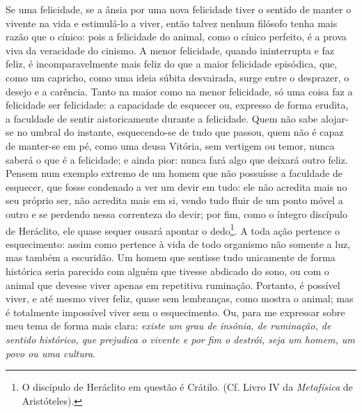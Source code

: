 Se uma felicidade, se a ânsia por uma nova felicidade tiver o sentido de
manter o vivente na vida e estimulá-lo a viver, então talvez nenhum
filósofo tenha mais razão que o cínico: pois a felicidade do animal,
como o cínico perfeito, é a prova viva da veracidade do cinismo. A menor
felicidade, quando ininterrupta e faz feliz, é incomparavelmente mais
feliz do que a maior felicidade episódica, que, como um capricho, como
uma ideia súbita desvairada, surge entre o desprazer, o desejo e a
carência. Tanto na maior como na menor felicidade, só uma coisa faz a
felicidade ser felicidade: a capacidade de esquecer ou, expresso de
forma erudita, a faculdade de sentir aistoricamente durante a
felicidade. Quem não sabe alojar-se no umbral do instante,
esquecendo-se de tudo que passou, quem não é capaz de manter-se em pé, 
como uma deusa Vitória, sem vertigem ou temor, nunca saberá o que
é a felicidade; e ainda pior: nunca fará algo que deixará outro feliz.
Pensem num exemplo extremo de um homem que não possuísse a faculdade de
esquecer, que fosse condenado a ver um devir em tudo: ele não acredita
mais no seu próprio ser, não acredita mais em si, vendo tudo fluir de um
ponto móvel a outro e se perdendo nessa correnteza do devir; por fim,
como o íntegro discípulo de Heráclito, ele quase sequer ousará apontar o
dedo\footnote{O discípulo de Heráclito em questão é Crátilo. (Cf. Livro
  IV da \emph{Metafísica} de Aristóteles).}. A toda ação pertence o
esquecimento: assim como pertence à vida de todo organismo não somente a
luz, mas também a escuridão. Um homem que sentisse tudo unicamente de
forma histórica seria parecido com alguém que tivesse abdicado do sono,
ou com o animal que devesse viver apenas em repetitiva ruminação.
Portanto, é possível viver, e até mesmo viver feliz, quase sem
lembranças, como mostra o animal; mas é totalmente impossível viver sem
o esquecimento. Ou, para me expressar sobre meu tema de forma mais
clara: \emph{existe um grau de insônia, de ruminação, de sentido
histórico, que prejudica o vivente e por fim o destrói, seja um homem,
um povo ou uma cultura}.

